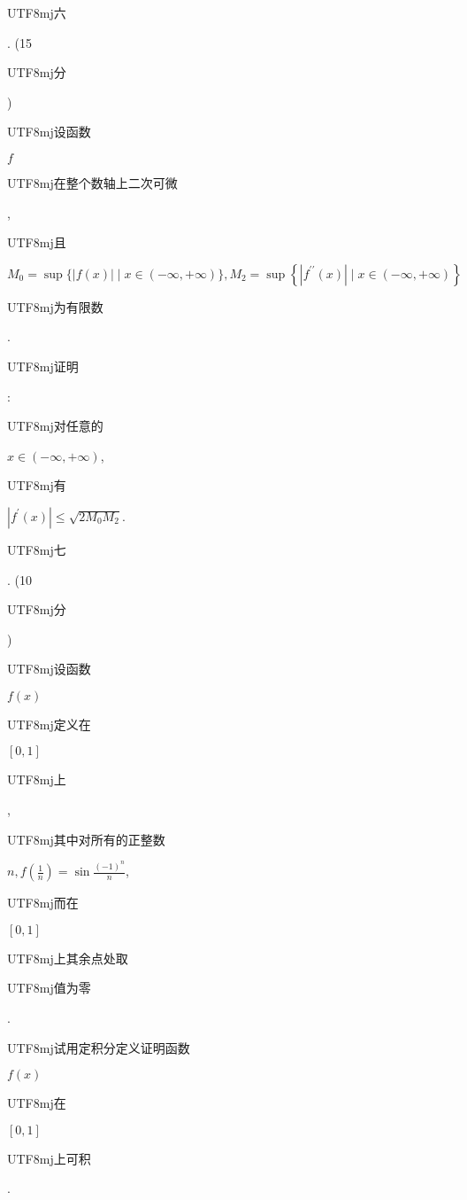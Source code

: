 \documentclass[10pt]{article}
\begin{document}
\begin{CJK}{UTF8}{mj}六\end{CJK}. (15 \begin{CJK}{UTF8}{mj}分\end{CJK}) \begin{CJK}{UTF8}{mj}设函数\end{CJK} $f$ \begin{CJK}{UTF8}{mj}在整个数轴上二次可微\end{CJK}, \begin{CJK}{UTF8}{mj}且\end{CJK}
$$
M_{0}=\sup \{|f(x)| \mid x \in(-\infty,+\infty)\}, M_{2}=\sup \left\{\left|f^{\prime \prime}(x)\right| \mid x \in(-\infty,+\infty)\right\}
$$
\begin{CJK}{UTF8}{mj}为有限数\end{CJK}. \begin{CJK}{UTF8}{mj}证明\end{CJK}: \begin{CJK}{UTF8}{mj}对任意的\end{CJK} $x \in(-\infty,+\infty)$, \begin{CJK}{UTF8}{mj}有\end{CJK} $\left|f^{\prime}(x)\right| \leqslant \sqrt{2 M_{0} M_{2}}$.

\begin{CJK}{UTF8}{mj}七\end{CJK}. (10 \begin{CJK}{UTF8}{mj}分\end{CJK}) \begin{CJK}{UTF8}{mj}设函数\end{CJK} $f(x)$ \begin{CJK}{UTF8}{mj}定义在\end{CJK} $[0,1]$ \begin{CJK}{UTF8}{mj}上\end{CJK}, \begin{CJK}{UTF8}{mj}其中对所有的正整数\end{CJK} $n, f\left(\frac{1}{n}\right)=\sin \frac{(-1)^{n}}{n}$, \begin{CJK}{UTF8}{mj}而在\end{CJK} $[0,1]$ \begin{CJK}{UTF8}{mj}上其余点处取\end{CJK} \begin{CJK}{UTF8}{mj}值为零\end{CJK}. \begin{CJK}{UTF8}{mj}试用定积分定义证明函数\end{CJK} $f(x)$ \begin{CJK}{UTF8}{mj}在\end{CJK} $[0,1]$ \begin{CJK}{UTF8}{mj}上可积\end{CJK}.
\end{document}
